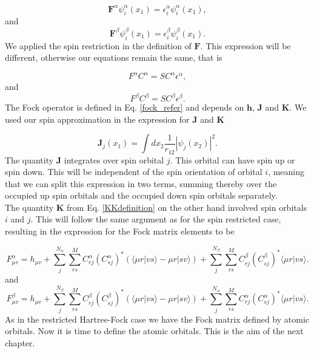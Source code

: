 \documentclass[a4paper,norsk,11pt,twoside]{report}
\begin{document}
\begin{equation}
\textbf{F}^{\alpha} \psi_i^{\alpha}(x_1) = \epsilon_i^{\alpha} \psi_i^{\alpha}(x_1) ,
\end{equation}
and
\begin{equation}
\textbf{F}^{\beta} \psi_i^{\beta}(x_1) = \epsilon_i^{\beta} \psi_i^{\beta}(x_1) .
\end{equation}
We applied the spin restriction in the definition of $\textbf{F}$. 
This expression will be different, otherwise our equations remain the same, that is

\begin{equation}
F^{\alpha} C^{\alpha} = S C^{\alpha} \epsilon^{\alpha} ,
\end{equation}
and
\begin{equation}
F^{\beta} C^{\beta} = S C^{\beta} \epsilon^{\beta} .
\end{equation}
The Fock operator is defined in Eq. \eqref{fock_refer} and depends on
$\textbf{h}$, $\textbf{J}$ and $\textbf{K}$. We used our spin
approximation in the expression for $\textbf{J}$ and $\textbf{K}$

\begin{equation}
\textbf{J}_j(x_1) = \int dx_2
\frac{1}{r_{12}} |\psi_j(x_2)|^2 . \label{Jdefinition}
\end{equation}
The quantity $\textbf{J}$ integrates over spin orbital $j$. This
orbital can have spin up or spin down. This will be independent of the
spin orientation of orbital $i$, meaning that  we can split this
expression in two terms, summing thereby over the occupied up spin orbitals and the
occupied down spin orbitals separately. \\

The quantity
$\textbf{K}$ from Eq. \eqref{KKdefinition} on the other hand involved spin orbitals $i$ and $j$. This will follow the same 
argument as for the spin restricted case, resulting in the expression for the Fock matrix elements to be

\begin{equation}
F_{\mu v}^{\alpha} = 
h_{\mu v}
+ \sum_j^{N_{\alpha}} 
\sum_{rs}^M C_{rj}^{\alpha} \left(C_{sj}^{\alpha}\right)^* 
(\langle \mu r | v s \rangle 
- \mu r | s v \rangle)
+ \sum_j^{N_{\beta}} 
\sum_{rs}^M C_{rj}^{\beta} \left(C_{sj}^{\beta} \right)^* 
\langle \mu r | vs \rangle .
\label{Fock_Restricted_2}
\end{equation}
and
\begin{equation}
F_{\mu v}^{\beta} = 
h_{\mu v}
+ \sum_j^{N_{\beta}} 
\sum_{rs}^M C_{rj}^{\beta} \left(C_{sj}^{\beta}\right)^* 
(\langle \mu r | v s \rangle 
- \mu r | s v \rangle)
+ \sum_j^{N_{\alpha}} 
\sum_{rs}^M C_{rj}^{\alpha} \left(C_{sj}^{\alpha} \right)^* 
\langle \mu r | vs \rangle .
\label{Fock_Restricted_3}
\end{equation}
As in the restricted Hartree-Fock case we have the Fock matrix defined by atomic orbitals. Now it is time to 
define the atomic orbitals. This is the aim of the next chapter.
\end{document}
